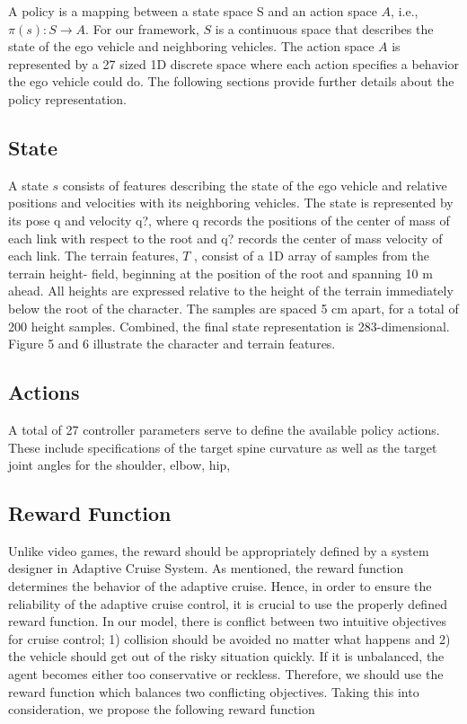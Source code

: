 A policy is a mapping between a state space S and an action space $A$, i.e., $\pi(s) : S \to A$. For our framework, $S$ is a continuous space that describes the state of the ego vehicle and neighboring vehicles. The action space $A$ is represented by a 27 sized 1D discrete space where each action specifies a behavior the ego vehicle could do. The following sections provide further details about the policy representation.

\subsection{State}

A state $s$ consists of features describing the state of the ego vehicle and relative positions and velocities with its neighboring vehicles. The state is represented by its pose q and velocity q?, where q records the positions of the center of mass of each link with respect to the root and q? records the center of mass velocity of each link. The terrain features, $T$ , consist of a 1D array of samples from the terrain height- field, beginning at the position of the root and spanning 10 m ahead. All heights are expressed relative to the height of the terrain immediately below the root of the character. The samples are spaced 5 cm apart, for a total of 200 height samples. Combined, the final state representation is 283-dimensional. Figure 5 and 6 illustrate the character and terrain features.

\subsection{Actions}

A total of 27 controller parameters serve to define the available policy actions. These include specifications of the target spine curvature as well as the target joint angles for the shoulder, elbow, hip,

\subsection{Reward Function}

Unlike video games, the reward should be appropriately defined by a system designer in Adaptive Cruise System. As mentioned, the reward function determines the behavior of the adaptive cruise. Hence, in order to ensure the reliability of the adaptive cruise control, it is crucial to use the properly defined reward function. In our model, there is conflict between two intuitive objectives for cruise control; 1) collision should be avoided no matter what happens and 2) the vehicle should get out of the risky situation quickly. If it is unbalanced, the agent becomes either too conservative or reckless. Therefore, we should use the reward function which balances two conflicting objectives. Taking this into consideration, we propose the following reward function

